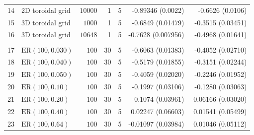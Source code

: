 \documentclass[review]{elsarticle}
\numberwithin{equation}{section}
\begin{document}
\begin{table}
\begin{center}
{\begin{tabular}{l|lrrrrr}
14  & 2D toroidal grid     &$10000$ & 1 & 5  & -0.89346 (0.0022) & -0.6626 (0.0106)\\
15  & 3D toroidal grid     &$1000$ & 1 & 5  & -0.6849 (0.01479) & -0.3515 (0.03451)\\
16  & 3D toroidal grid     &$10648$& 1 & 5  &  -0.7628 (0.007956) & -0.4968 (0.01641)\\
\hline\\
17  & $\mathrm{ER}(100,0.030)$  & $100$ & 30 & 5 & -0.6063 (0.01383) &  -0.4052 (0.02710)\\
18  & $\mathrm{ER}(100,0.040)$  & $100$ & 30 & 5 & -0.5179 (0.01855) &  -0.3151 (0.02244)\\
19  & $\mathrm{ER}(100,0.050)$  & $100$ & 30 & 5 & -0.4059 (0.02020) &  -0.2246 (0.01952)\\
20  & $\mathrm{ER}(100,0.10)$  & $100$ & 30 & 5 & -0.1997 (0.03106) &  -0.1280 (0.03063)\\
21  & $\mathrm{ER}(100,0.20)$  & $100$ & 30 & 5 & -0.1074 (0.03961) &  -0.06166 (0.03020)\\
22  & $\mathrm{ER}(100,0.40)$  & $100$ & 30 & 5 & 0.02247 (0.06603) &  0.01541 (0.05499)\\
23  & $\mathrm{ER}(100,0.64)$  & $100$ & 30 & 5 & -0.01097 (0.03984) &  0.01046 (0.05112)\\

\end{tabular}}
\end{center}
\end{table}
\end{document}
